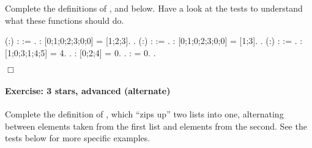 \documentclass[12pt]{report}
\begin{document}
 Complete the definitions of ,  and
     below. Have a look at the tests to understand
    what these functions should do. \begin{coqdoccode}
\coqdocemptyline
\coqdocnoindent
{}  (:) :  :=\coqdoceol
\coqdocindent{1.00em}
 .\coqdoceol
\coqdocemptyline
\coqdocnoindent
{} :             [0;1;0;2;3;0;0] = [1;2;3].\coqdoceol
 .\coqdoceol
\coqdocemptyline
\coqdocnoindent
{}  (:) :  :=\coqdoceol
\coqdocindent{1.00em}
 .\coqdoceol
\coqdocemptyline
\coqdocnoindent
{} :             [0;1;0;2;3;0;0] = [1;3].\coqdoceol
 .\coqdoceol
\coqdocemptyline
\coqdocnoindent
{}  (:) :  :=\coqdoceol
\coqdocindent{1.00em}
 .\coqdoceol
\coqdocemptyline
\coqdocnoindent
{} :     [1;0;3;1;4;5] = 4.\coqdoceol
 .\coqdoceol
\coqdocnoindent
{} :     [0;2;4] = 0.\coqdoceol
 .\coqdoceol
\coqdocnoindent
{} :      = 0.\coqdoceol
 .\coqdoceol
\end{coqdoccode}
\ensuremath{\Box} 

\paragraph{Exercise: 3 stars, advanced (alternate)}

 Complete the definition of , which ``zips up'' two lists
    into one, alternating between elements taken from the first list
    and elements from the second.  See the tests below for more
    specific examples.
\end{document}
